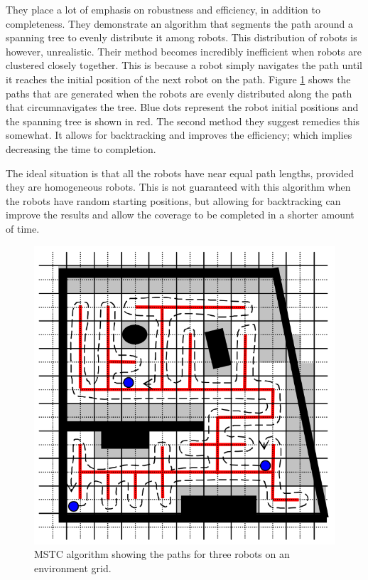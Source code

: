 They place a lot of emphasis on robustness and efficiency, in addition to completeness. They demonstrate an algorithm that segments the path around a spanning tree to evenly distribute it among robots. This distribution of robots is however, unrealistic. Their method becomes incredibly inefficient when robots are clustered closely together. This is because a robot simply navigates the path until it reaches the initial position of the next robot on the path. Figure \ref{fig:MSTC} shows the paths that are generated when the robots are evenly distributed along the path that circumnavigates the tree. Blue dots represent the robot initial positions and the spanning tree is shown in red. The second method they suggest remedies this somewhat. It allows for backtracking and improves the efficiency; which implies decreasing the time to completion.

The ideal situation is that all the robots have near equal path lengths, provided they are homogeneous robots. This is not guaranteed with this algorithm when the robots have random starting positions, but allowing for backtracking can improve the results and allow the coverage to be completed in a shorter amount of time. 

\begin{figure}
	\centering
	\includegraphics[scale=0.4]{figs/MSTC-Graphic}
	\caption{MSTC algorithm showing the paths for three robots on an environment grid. \cite{Hazon2005}}
	\label{fig:MSTC}
\end{figure}

